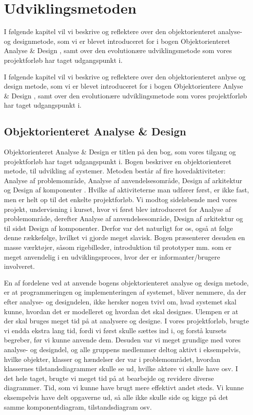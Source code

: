 \chapter{Udviklingsmetoden}
I følgende kapitel vil vi beskrive og reflektere over den objektorienteret analyse- og designmetode, som vi er blevet introduceret for i bogen Objektorienteret Analyse \& Design \cite{ooad}, samt over den evolutionære udviklingsmetode som vores projektforløb har taget udgangspunkt i.

\label{udviklingsmetoden}
I følgende kapitel vil vi beskrive og reflektere over den objektorienteret anlyse og design metode, som vi er blevet introduceret for i bogen Objektorientere Anlyse \& Design \cite{ooad}, samt over den evolutionære udviklingsmetode som vores projektforløb har taget udgangspunkt i. 

\section{Objektorienteret Analyse \& Design}
Objektorienteret Analyse \& Design er titlen på den bog, som vores tilgang og projektforløb har taget udgangspunkt i. Bogen beskriver en objektorienteret metode, til udvikling af systemer. Metoden består af fire hovedaktiviteter: Analyse af problemområde, Analyse af anvendelsesområde, Design af arkitektur og Design af komponenter \cite[p~ 15]{ooad}. Hvilke af aktiviteterne man udfører først, er ikke fast, men er helt op til det enkelte projektforløb. Vi modtog sideløbende med vores projekt, undervisning i kurset, hvor vi først blev introduceret for Analyse af problemområde, derefter Analyse af anvendelsesområde, Design af arkitektur og til sidst Design af komponenter. Derfor var det naturligt for os, også at følge denne rækkefølge, hvilket vi gjorde meget slavisk. Bogen præsenterer desuden en masse værktøjer, såsom rigebilleder, introduktion til prototyper mm. som er meget anvendelig i en udviklingsproces, hvor der er informanter/brugere involveret.

En af fordelene ved at anvende bogens objektorienteret analyse og design metode, er at programmeringen og implementeringen af systemet, bliver nemmere, da der efter analyse- og designdelen, ikke hersker nogen tvivl om, hvad systemet skal kunne, hvordan det er modelleret og hvordan det skal designes. Ulempen er at der skal bruges meget tid på at analysere og designe. I vores projektforløb, brugte vi endda ekstra lang tid, fordi vi først skulle sættes ind i, og forstå kursets begreber, før vi kunne anvende dem. Desuden var vi meget grundige med vores analyse- og designdel, og alle gruppens medlemmer deltog aktivt i eksempelvis, hvilke objekter, klasser og hændelser der var i problemområdet, hvordan klassernes tilstandsdiagrammer skulle se ud, hvilke aktøre vi skulle have osv. I det hele taget, brugte vi meget tid på at bearbejde og revidere diverse diagrammer. Tid, som vi kunne have brugt mere effektivt andet steds. Vi kunne eksempelvis have delt opgaverne ud, så alle ikke skulle side og kigge på det samme komponentdiagram, tilstandsdiagram osv. 

